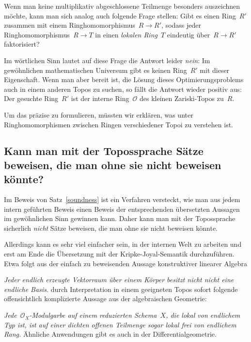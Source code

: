 \documentclass[a4paper,ngerman,12pt]{scrartcl}
\theoremstyle{definition}
\theoremstyle{plain}
\theoremstyle{remark}
\renewcommand{\O}{\mathcal{O}}
\renewcommand{\_}{\mathpunct{.}\,}
\newcommand{\?}{\,{:}\,}
\newenvironment{indentblock}{%
  \list{}{\leftmargin\leftmargin}%
  \item\relax
}{%
  \endlist
}
\begin{document}
Wenn man keine multiplikativ abgeschlossene Teilmenge besonders auszeichnen
möchte, kann man sich analog auch folgende Frage stellen: Gibt es einen
Ring~$R'$ zusammen mit einem Ringhomomorphismus~$R \to R'$, sodass jeder
Ringhomomorphismus~$R \to T$ in einen \emph{lokalen Ring}~$T$ eindeutig über~$R
\to R'$ faktorisiert?

Im wörtlichen Sinn lautet auf diese Frage die Antwort leider \emph{nein}: Im
gewöhnlichen mathematischen Universum gibt es keinen Ring~$R'$ mit dieser
Eigenschaft. Wenn man aber bereit ist, die Lösung
dieses Optimierungsproblems auch in einem anderen Topos zu suchen, so fällt die
Antwort wieder positiv aus: Der gesuchte Ring~$R'$ ist der interne Ring~$\O$
des kleinen Zariski-Topos zu~$R$.

Um das präzise zu formulieren, müssten wir erklären, was unter
Ringhomomorphismen zwischen Ringen verschiedener Topoi zu verstehen ist.


\subsection*{Kann man mit der Topossprache Sätze beweisen, die man ohne sie
nicht beweisen könnte?}

Im Beweis von Satz~\ref{soundness} ist ein Verfahren versteckt, wie man aus
jedem intern geführten Beweis einen Beweis der entsprechenden übersetzten
Aussagen im gewöhnlichen Sinn gewinnen kann. Daher kann man mit der
Topossprache sicherlich \emph{nicht} Sätze beweisen, die man ohne sie nicht
beweisen könnte.

Allerdings kann es sehr viel einfacher sein, in der internen Welt zu arbeiten
und erst am Ende die Übersetzung mit der Kripke-Joyal-Semantik durchzuführen.
Etwa folgt aus der einfach zu beweisenden Aussage konstruktiver linearer
Algebra
\begin{indentblock}
\emph{Jeder endlich erzeugte Vektorraum über einem Körper besitzt nicht nicht
eine endliche Basis.}
\end{indentblock}
durch Interpretation in einem geeigneten Topos sofort folgende offensichtlich
komplizierte Aussage aus der algebraischen Geometrie:
\begin{indentblock}
\emph{Jede~$\O_X$-Modulgarbe auf einem reduzierten Schema~$X$, die lokal von
endlichem Typ ist, ist auf einer dichten offenen Teilmenge sogar lokal frei von
endlichem Rang.}
\end{indentblock}
Ähnliche Anwendungen gibt es auch in der Differentialgeometrie.
\end{document}
